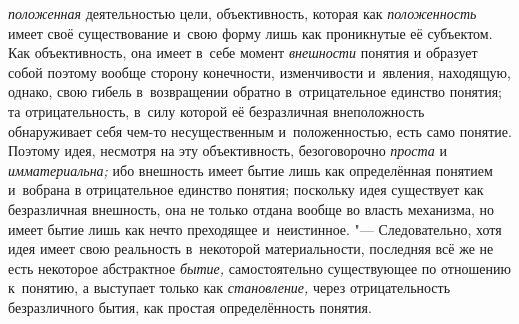 {\em положенная}
деятельностью цели, объективность, которая как
{\em положенность} имеет
своё существование и~свою форму лишь как проникнутые её субъектом. Как
объективность, она имеет в~себе момент
{\em внешности} понятия и
образует собой поэтому вообще сторону конечности, изменчивости и~явления,
находящую, однако, свою гибель в~возвращении обратно в~отрицательное
единство понятия; та отрицательность, в~силу которой её безразличная
внеположность обнаруживает себя чем-то несущественным и~положенностью, есть
само понятие. Поэтому идея, несмотря на эту объективность, безоговорочно
{\em проста} и {\em имматериальна;} ибо
внешность имеет бытие лишь как определённая понятием и~вобрана в
отрицательное единство понятия; поскольку идея существует как безразличная
внешность, она не только отдана вообще во власть механизма, но имеет бытие
лишь как нечто преходящее и~неистинное. "--- Следовательно,
хотя идея имеет свою реальность в~некоторой материальности, последняя всё
же не есть некоторое абстрактное
{\em бытие,}
самостоятельно существующее по отношению к~понятию, а
выступает только как {\em становление,}
через отрицательность безразличного бытия, как простая
определённость понятия.

